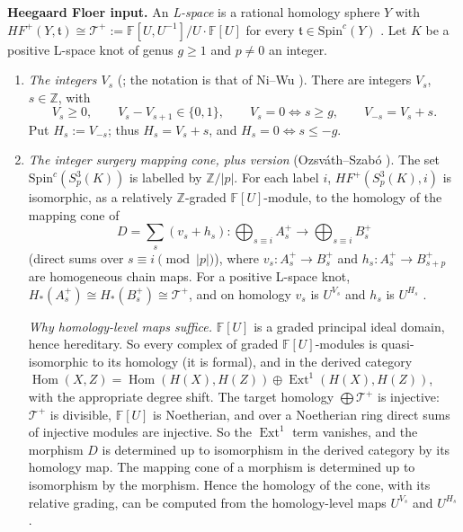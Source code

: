 \documentclass[11pt]{article}
\theoremstyle{definition}
\newcommand{\F}{\mathbb{F}}
\newcommand{\Z}{\mathbb{Z}}
\newcommand{\Tp}{\mathcal{T}^+}
\newcommand{\HFp}{\mathit{HF}^+}
\newcommand{\Spinc}{\mathrm{Spin}^c}
\begin{document}
\medskip
\noindent\textbf{Heegaard Floer input.} An \emph{L-space} is a rational homology sphere $Y$ with $\HFp(Y,\mathfrak t)\cong\Tp:=\F[U,U^{-1}]/U\cdot\F[U]$ for every $\mathfrak t\in\Spinc(Y)$ \cite{OSlens}. Let $K$ be a positive L-space knot of genus $g\ge1$ and $p\ne0$ an integer.

\begin{enumerate}[label=(H\arabic*),leftmargin=*]
\item\label{H:V} \emph{The integers $V_s$} (\cite{OSinteger,OSlens}; the notation is that of Ni--Wu \cite{NiWu}). There are integers $V_s$, $s\in\Z$, with
\[
V_s\ge0,\qquad V_s-V_{s+1}\in\{0,1\},\qquad V_s=0\iff s\ge g,\qquad V_{-s}=V_s+s.
\]
Put $H_s:=V_{-s}$; thus $H_s=V_s+s$, and $H_s=0\iff s\le -g$.

\item\label{H:cone} \emph{The integer surgery mapping cone, plus version} (Ozsv\'ath--Szab\'o \cite{OSinteger}). The set $\Spinc(S^3_p(K))$ is labelled by $\Z/|p|$. For each label $i$, $\HFp(S^3_p(K),i)$ is isomorphic, as a relatively $\Z$-graded $\F[U]$-module, to the homology of the mapping cone of
\[
D=\sum_s(v_s+h_s)\colon \bigoplus_{s\equiv i}A_s^+\longrightarrow\bigoplus_{s\equiv i}B_s^+
\]
(direct sums over $s\equiv i\pmod{|p|}$), where $v_s\colon A^+_s\to B^+_s$ and $h_s\colon A_s^+\to B^+_{s+p}$ are homogeneous chain maps. For a positive L-space knot, $H_*(A^+_s)\cong H_*(B^+_s)\cong\Tp$, and on homology $v_s$ is $U^{V_s}$ and $h_s$ is $U^{H_s}$ \cite{OSlens,OSinteger}.


\emph{Why homology-level maps suffice.} $\F[U]$ is a graded principal ideal domain, hence hereditary. So every complex of graded $\F[U]$-modules is quasi-isomorphic to its homology (it is formal), and in the derived category $\operatorname{Hom}(X,Z)=\operatorname{Hom}(H(X),H(Z))\oplus\operatorname{Ext}^1(H(X),H(Z))$, with the appropriate degree shift. The target homology $\bigoplus\Tp$ is injective: $\Tp$ is divisible, $\F[U]$ is Noetherian, and over a Noetherian ring direct sums of injective modules are injective. So the $\operatorname{Ext}^1$ term vanishes, and the morphism $D$ is determined up to isomorphism in the derived category by its homology map. The mapping cone of a morphism is determined up to isomorphism by the morphism. Hence the homology of the cone, with its relative grading, can be computed from the homology-level maps $U^{V_s}$ and $U^{H_s}$.


\end{enumerate}
\end{document}
